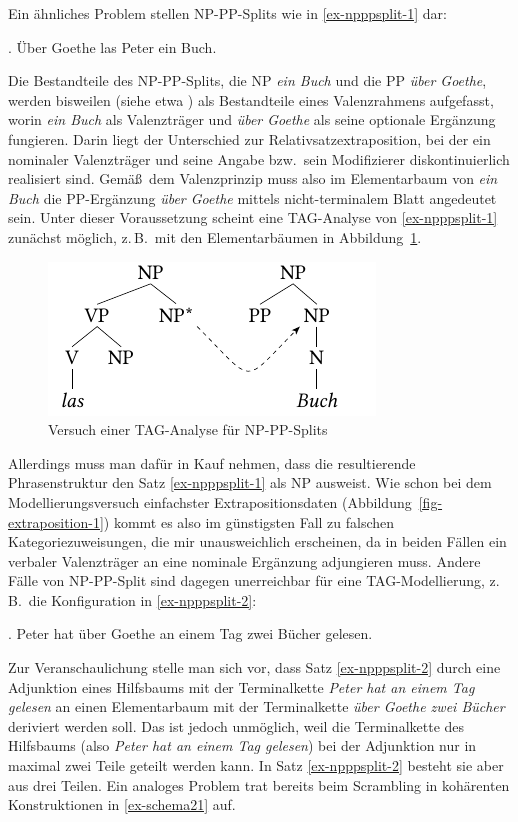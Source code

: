 Ein ähnliches Problem stellen NP-PP-Splits wie in \ref{ex-npppsplit-1} dar:

\ex. \label{ex-npppsplit-1} Über Goethe las Peter ein Buch. 

Die Bestandteile des NP-PP-Splits, die NP {\it ein Buch} und die PP {\it über Goethe}, werden bisweilen (siehe etwa \citealt{DeKuthy:02}) als Bestandteile eines Valenzrahmens aufgefasst, worin {\it ein Buch} als Valenzträger und {\it über Goethe} als seine optionale Ergänzung fungieren. Darin liegt der Unterschied zur Relativsatzextraposition, bei der ein nominaler Valenzträger und seine  Angabe bzw.\ sein Modifizierer diskontinuierlich realisiert sind. Gemä\ss\ dem Valenzprinzip muss also im Elementarbaum von {\it ein Buch} die PP-Ergänzung {\it über Goethe} mittels nicht-terminalem Blatt angedeutet sein. Unter dieser Voraussetzung scheint eine TAG-Analyse von \ref{ex-npppsplit-1} zunächst möglich, z.\,B.\ mit den Elementarbäumen in Abbildung~\ref{fig-npppsplit-1}.
\begin{figure}[t]
\centering
\includegraphics{graphics/abb519.pdf}
\caption{\label{fig-npppsplit-1}Versuch einer TAG-Analyse für NP-PP-Splits}
\end{figure}
Allerdings muss man dafür in Kauf nehmen, dass die resultierende Phrasenstruktur den Satz \ref{ex-npppsplit-1} als NP ausweist. Wie schon bei dem Modellierungsversuch einfachster Extrapositionsdaten (Abbildung~\ref{fig-extraposition-1}) kommt es also im günstigsten Fall zu falschen Kategoriezuweisungen, die mir unausweichlich erscheinen, da in beiden Fällen ein verbaler Valenzträger an eine nominale Ergänzung adjungieren muss. Andere Fälle von NP-PP-Split sind dagegen unerreichbar für eine TAG-Modellierung, z.\,B.\ die Konfiguration in \ref{ex-npppsplit-2}: 

\ex. \label{ex-npppsplit-2} Peter hat über Goethe an einem Tag zwei Bücher gelesen.

Zur Veranschaulichung stelle man sich vor, dass Satz \ref{ex-npppsplit-2}  durch eine Adjunktion eines Hilfsbaums mit der Terminalkette  {\it Peter hat an einem Tag gelesen} an einen Elementarbaum mit der Terminalkette {\it über Goethe zwei Bücher} deriviert werden soll. Das ist jedoch unmöglich, weil die Terminalkette des Hilfsbaums (also {\it Peter hat an einem Tag gelesen}) bei der Adjunktion nur in maximal zwei Teile geteilt werden kann. In Satz \ref{ex-npppsplit-2} besteht sie aber aus drei Teilen. Ein analoges Problem trat bereits beim Scrambling in kohärenten Konstruktionen in \ref{ex-schema21} auf. 

